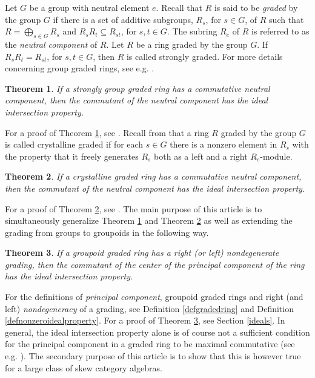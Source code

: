 \documentclass[11pt,leqno]{amsart}
\theoremstyle{plain}
\newtheorem{thm}{Theorem}
\theoremstyle{definition}
\begin{document}
Let $G$ be a group with neutral element $e$.
Recall that $R$ is said to be \emph{graded} by the group $G$
if there is a set of additive subgroups,
$R_s$, for $s \in G$, of $R$ such that $R =
\bigoplus_{s \in G} R_s$ and $R_s R_t \subseteq
R_{st}$, for $s,t \in G$.
The subring $R_e$ of $R$ is referred to as the \emph{neutral component} of $R$.
Let $R$ be a ring graded by the group $G$.
If $R_s R_t = R_{st}$, for $s,t \in G$,
then $R$ is called strongly graded.
For more details concerning group graded rings,
see e.g. \cite{nas}.

\begin{thm}\label{TheoremOne}
If a strongly group graded ring has a commutative
neutral component, then the commutant of
the neutral component has the ideal
intersection property.
\end{thm}

For a proof of Theorem \ref{TheoremOne},
see \cite[Theorem 4]{oin10}.
Recall from \cite{nauoyst} that a ring $R$ graded
by the group $G$ is called
crystalline graded if for each $s \in G$ there
is a nonzero element in $R_s$ with the
property that it freely generates $R_s$ both as
a left and a right $R_e$-module.

\begin{thm}\label{TheoremTwo}
If a crystalline graded ring has a commutative
neutral component, then the commutant of
the neutral component has the ideal
intersection property.
\end{thm}

For a proof of Theorem \ref{TheoremTwo},
see \cite[Theorem 5]{oin10}.
The main purpose of this article is to simultaneously
generalize Theorem \ref{TheoremOne} and Theorem \ref{TheoremTwo}
as well as extending the grading from
groups to groupoids in the following way.

\begin{thm}\label{maintheorem}
If a groupoid graded ring has
a right (or left) nondegenerate grading,
then the commutant of the center of
the principal component of the ring
has the ideal intersection property.
\end{thm}

For the definitions of \emph{principal component}, groupoid graded rings
and right (and left) \emph{nondegeneracy} of a grading,
see Definition \ref{defgradedring} and
Definition \ref{defnonzeroidealproperty}.
For a proof of Theorem \ref{maintheorem}, see Section \ref{ideals}.
In general, the ideal intersection property alone
is of course not a sufficient condition
for the principal component in a graded ring to be maximal commutative
(see e.g. \cite[Example 2.3]{oin07}).
The secondary purpose of this article
is to show that this is however true for a large class
of skew category algebras.
\end{document}
